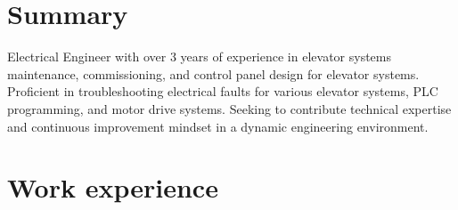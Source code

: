 \documentclass[9pt]{extarticle}
\begin{document}
\begin{paracol}{2}
\section{Summary}

Electrical Engineer with over 3 years of experience in elevator systems maintenance,
commissioning, and control panel design for elevator systems. Proficient in troubleshooting electrical faults for various elevator systems, PLC programming,
and motor drive systems. Seeking to contribute technical expertise and continuous improvement mindset in a
dynamic engineering environment.

\section{Work experience}


\end{paracol}
\end{document}
